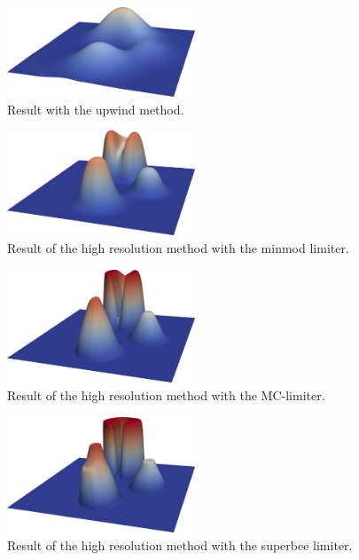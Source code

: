 \begin{figure}
     \centering  
    \includegraphics[width= 0.5\textwidth]{Figures/solidbodyrotup.png}
    \caption{%
        Result with the upwind method.
        }%
   \label{fig:sbrotup}
\end{figure}

\begin{figure}
     \centering  
    \includegraphics[width= 0.5\textwidth]{Figures/solidbodyrotminmod.png}
    \caption{%
        Result of the high resolution method with the minmod limiter.
        }%
   \label{fig:sbrotmm}
\end{figure}

\begin{figure}
     \centering  
    \includegraphics[width= 0.5\textwidth]{Figures/solidbodyrotmc.png}
    \caption{%
        Result of the high resolution method with the MC-limiter.
        }%
   \label{fig:sbrotmc}
\end{figure}


\begin{figure}
     \centering  
    \includegraphics[width= 0.5\textwidth]{Figures/solidbodyrotsb.png}
    \caption{%
        Result of the high resolution method with the superbee limiter.
        }%
   \label{fig:sbrotsb}
\end{figure}


